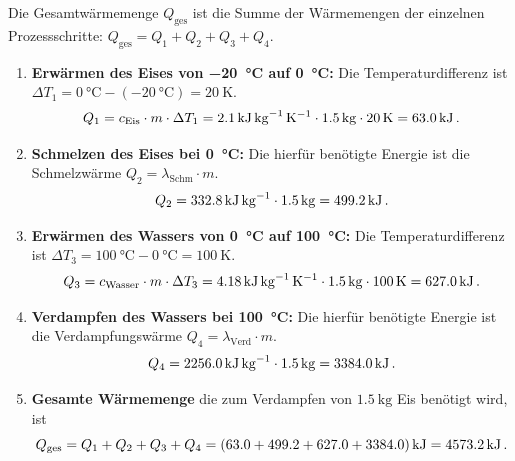 \documentclass[ngerman]{scrreprt}
\newenvironment{loesungbox}[1]
  {\needspace{5\baselineskip}\begin{loesungboxstyle}[frametitle={#1}]}
  {\end{loesungboxstyle}}
\begin{document}
\begin{loesungbox}{Lösung zu \Cref{aufg:eis_zu_dampf}}
Die Gesamtwärmemenge $Q_{\text{ges}}$ ist die Summe der Wärmemengen der einzelnen Prozessschritte: $Q_{\text{ges}} = Q_1 + Q_2 + Q_3 + Q_4$.
\begin{enumerate}
    \item \textbf{Erwärmen des Eises von \SI{-20}{\celsius} auf \SI{0}{\celsius}:}
    Die Temperaturdifferenz ist $\Delta T_1 = \SI{0}{\celsius} - (\SI{-20}{\celsius}) = \SI{20}{\kelvin}$.
    \begin{equation}
        Q_1 = c_{\text{Eis}} \cdot m \cdot \Delta T_1 = \SI{2.1}{\kilo\joule\per\kilo\gram\per\kelvin} \cdot \SI{1.5}{\kilo\gram} \cdot \SI{20}{\kelvin} = \SI{63.0}{\kilo\joule} \,.
    \end{equation}
    
    \item \textbf{Schmelzen des Eises bei \SI{0}{\celsius}:}
    Die hierfür benötigte Energie ist die Schmelzwärme $Q_2 = \lambda_{\text{Schm}} \cdot m$.
    \begin{equation}
        Q_2 = \SI{332.8}{\kilo\joule\per\kilo\gram} \cdot \SI{1.5}{\kilo\gram} = \SI{499.2}{\kilo\joule} \,.
    \end{equation}
    
    \item \textbf{Erwärmen des Wassers von \SI{0}{\celsius} auf \SI{100}{\celsius}:}
    Die Temperaturdifferenz ist $\Delta T_3 = \SI{100}{\celsius} - \SI{0}{\celsius} = \SI{100}{\kelvin}$.
    \begin{equation}
        Q_3 = c_{\text{Wasser}} \cdot m \cdot \Delta T_3 = \SI{4.18}{\kilo\joule\per\kilo\gram\per\kelvin} \cdot \SI{1.5}{\kilo\gram} \cdot \SI{100}{\kelvin} = \SI{627.0}{\kilo\joule} \,.
    \end{equation}
    
    \item \textbf{Verdampfen des Wassers bei \SI{100}{\celsius}:}
    Die hierfür benötigte Energie ist die Verdampfungswärme $Q_4 = \lambda_{\text{Verd}} \cdot m$.
    \begin{equation}
        Q_4 = \SI{2256.0}{\kilo\joule\per\kilo\gram} \cdot \SI{1.5}{\kilo\gram} = \SI{3384.0}{\kilo\joule} \,.
    \end{equation}
    
    \item \textbf{Gesamte Wärmemenge} die zum Verdampfen von $\SI{1.5}{\kilo\gram}$ Eis benötigt wird, ist 
    \begin{equation}
        Q_{\text{ges}} = Q_1 + Q_2 + Q_3 + Q_4 = (63.0 + 499.2 + 627.0 + 3384.0)\,\si{\kilo\joule} = \SI{4573.2}{\kilo\joule} \,.
    \end{equation}
\end{enumerate}
\end{loesungbox}
\end{document}
